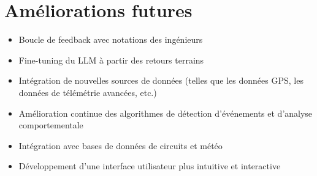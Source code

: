 \documentclass[a4paper,12pt]{report}
\begin{document}
\chapter{Améliorations futures}
\begin{itemize}
    \item Boucle de feedback avec notations des ingénieurs
    \item Fine-tuning du LLM à partir des retours terrains
    \item Intégration de nouvelles sources de données (telles que les données GPS, les données de télémétrie avancées, etc.)
    \item Amélioration continue des algorithmes de détection d'événements et d'analyse comportementale
    \item Intégration avec bases de données de circuits et météo
    \item Développement d'une interface utilisateur plus intuitive et interactive
\end{itemize}
\end{document}
